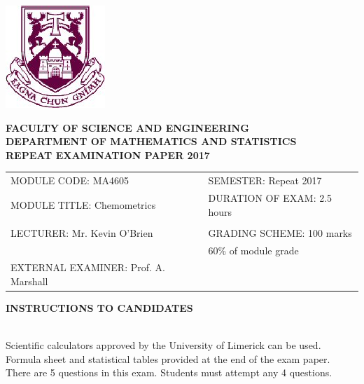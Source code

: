 \documentclass[a4paper,12pt]{article}
\begin{document}
	\begin{center}
		\includegraphics[scale=0.55]{images/shieldtransparent2}
	\end{center}
	
	\begin{center}
		\vspace{1cm}
		\large \bf {FACULTY OF SCIENCE AND ENGINEERING} \\[0.5cm]
		\normalsize DEPARTMENT OF MATHEMATICS AND STATISTICS \\[1.25cm]
		\large \bf {REPEAT EXAMINATION PAPER 2017} \\[1.5cm]
	\end{center}
	
	\begin{tabular}{ll}
		MODULE CODE: MA4605 & SEMESTER: Repeat 2017 \\[1cm]
		MODULE TITLE: Chemometrics & DURATION OF EXAM: 2.5 hours  \\
		 & \\ [1cm]
		LECTURER: Mr. Kevin O'Brien & GRADING SCHEME: 100 marks \\
		& \phantom{GRADING SCHEME:} \footnotesize {60\% of module grade} \\[1cm]
EXTERNAL EXAMINER: Prof. A. Marshall & \\
	\end{tabular}
\vspace{0.3cm}
	\begin{center}
		{\bf INSTRUCTIONS TO CANDIDATES}
	\end{center}
	
	{\noindent \\ Scientific calculators approved by the University of Limerick can be used. \\
		Formula sheet and statistical tables provided at the end of the exam paper.\\
		There are 5 questions in this exam. Students must attempt any 4 questions.}
	\newpage
\bigskip
\end{document}
